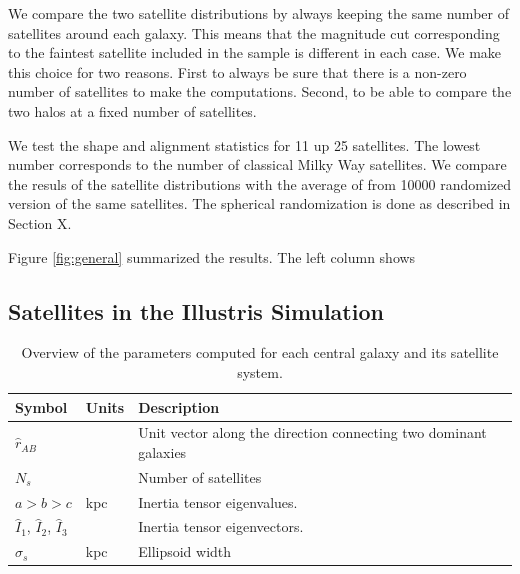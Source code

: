 \documentclass[a4paper,fleqn,usenatbib]{mnras}
\begin{document}
We compare the two satellite distributions by always keeping the same
number of satellites around each galaxy.
This means that the magnitude cut corresponding to the faintest
satellite included in the sample is different in each case.
We make this choice for two reasons. 
First to always be sure that there is a non-zero number of satellites to make the computations. 
Second, to be able to compare the two halos at a fixed number of
satellites. 

We test the shape and alignment statistics for 11 up 25 satellites.
The lowest number corresponds to the number of classical Milky Way
satellites.
We compare the resuls of the satellite distributions with the average
of from 10000 randomized version of the same satellites.
The spherical randomization is done as described in Section X.

Figure \ref{fig:general} summarized the results. 
The left column shows 



\subsection{Satellites in the Illustris Simulation}

\begin{table}
  \centering
\begin{tabular}{lll}
\hline\hline
Symbol & Units & Description\\\hline
$\hat{r}_{AB}$& & Unit vector along the direction connecting two
dominant galaxies\\
$N_s$ & & Number of satellites\\
$a > b> c$ & kpc & Inertia tensor eigenvalues. \\
$\hat{I}_1$, $\hat{I}_2$, $\hat{I}_3$ & & Inertia tensor eigenvectors. \\
$\sigma_s$ & kpc & Ellipsoid width\\
\hline\hline
\end{tabular}
  \caption{Overview of the parameters computed for each central galaxy
    and its satellite system.
  \label{tab:models}}
\end{table}







\end{document}
